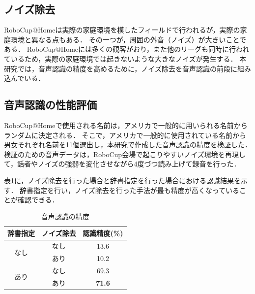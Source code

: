 \documentclass[a4j]{jarticle}
\begin{document}
\subsection{ノイズ除去}
RoboCup@Homeは実際の家庭環境を模したフィールドで行われるが，実際の家庭環境と異なる点もある．
その一つが，周囲の外音（ノイズ）が大きいことである．
RoboCup@Homeには多くの観客がおり，また他のリーグも同時に行われているため，実際の家庭環境では起きないような大きなノイズが発生する．
本研究では，音声認識の精度を高めるために，ノイズ除去\cite{sainburg2020finding}を音声認識の前段に組み込んでいる．

\subsection{音声認識の性能評価}
RoboCup@Homeで使用される名前は，アメリカで一般的に用いられる名前からランダムに決定される．
そこで，アメリカで一般的に使用されている名前から男女それぞれ名前を11個選出し，本研究で作成した音声認識の精度を検証した．
検証のための音声データは，RoboCup会場で起こりやすいノイズ環境を再現して，話者やノイズの強弱を変化させながら4度づつ読み上げて録音を行った．

表\ref{voice_recognition_result}に，ノイズ除去を行った場合と辞書指定を行った場合における認識結果を示す．
辞書指定を行い，ノイズ除去を行った手法が最も精度が高くなっていることが確認できる．
\begin{table}[ht]
	\centering
	\caption{音声認識の精度}
	\begin{tabular}{|c|c|c|}
	\hline
	辞書指定                & ノイズ除去 & 認識精度(\%)          \\ \hline
	\multirow{2}{*}{なし} & なし    & 13.6          \\ \cline{2-3}
	                    & あり    & 10.2          \\ \hline
	\multirow{2}{*}{あり} & なし    & 69.3          \\ \cline{2-3}
	                    & あり    & \textbf{71.6} \\ \hline
	\end{tabular}
	\label{voice_recognition_result}
\end{table}
\end{document}
